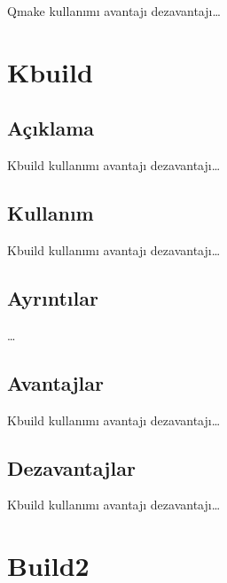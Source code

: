 \documentclass[
]{book}
\begin{document}
Qmake kullanımı avantajı dezavantajı\ldots{}

\hypertarget{kbuild}{%
\chapter*{Kbuild}\label{kbuild}}

\hypertarget{auxe7ux131klama-7}{%
\section*{Açıklama}\label{auxe7ux131klama-7}}

Kbuild kullanımı avantajı dezavantajı\ldots{}

\hypertarget{kullanux131m-6}{%
\section*{Kullanım}\label{kullanux131m-6}}

Kbuild kullanımı avantajı dezavantajı\ldots{}

\hypertarget{ayrux131ntux131lar-6}{%
\section*{Ayrıntılar}\label{ayrux131ntux131lar-6}}

\ldots{}

\hypertarget{avantajlar-6}{%
\section*{Avantajlar}\label{avantajlar-6}}

Kbuild kullanımı avantajı dezavantajı\ldots{}

\hypertarget{dezavantajlar-6}{%
\section*{Dezavantajlar}\label{dezavantajlar-6}}

Kbuild kullanımı avantajı dezavantajı\ldots{}

\hypertarget{build2}{%
\chapter*{Build2}\label{build2}}
\end{document}

